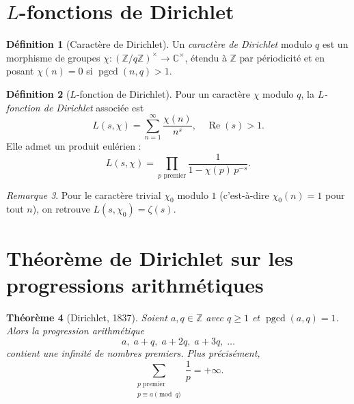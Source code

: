 \documentclass[12pt,a4paper,openany]{book}
\theoremstyle{definition}
\newtheorem{definition}{Définition}[chapter]
\theoremstyle{plain}
\newtheorem{theoreme}[definition]{Théorème}
\theoremstyle{remark}
\newtheorem{remarque}[definition]{Remarque}
\newcommand{\Z}{\mathbb{Z}}
\newcommand{\C}{\mathbb{C}}
\DeclareMathOperator{\pgcd}{pgcd}
\begin{document}

\section{\texorpdfstring{$L$}{L}-fonctions de Dirichlet}
\label{sec:L-fonctions}

\begin{definition}[Caractère de Dirichlet]
\label{def:caractere-dirichlet}
Un \emph{caractère de Dirichlet} modulo $q$ est un morphisme de groupes
$\chi : (\Z/q\Z)^{\times} \to \C^{\times}$, étendu à $\Z$ par périodicité et
en posant $\chi(n) = 0$ si $\pgcd(n,q) > 1$.
\end{definition}

\begin{definition}[$L$-fonction de Dirichlet]
\label{def:L-fonction}
Pour un caractère $\chi$ modulo $q$, la \emph{$L$-fonction de Dirichlet} associée est
\[
  L(s, \chi) = \sum_{n=1}^{\infty} \frac{\chi(n)}{n^s}, \quad \operatorname{Re}(s) > 1.
\]
Elle admet un produit eulérien :
\[
  L(s, \chi) = \prod_{p \text{ premier}} \frac{1}{1 - \chi(p)\, p^{-s}}.
\]
\end{definition}

\begin{remarque}
\label{rem:L-fonction-zeta}
Pour le caractère trivial $\chi_0$ modulo $1$ (c'est-à-dire $\chi_0(n) = 1$
pour tout $n$), on retrouve $L(s, \chi_0) = \zeta(s)$.
\end{remarque}


\section{Théorème de Dirichlet sur les progressions arithmétiques}
\label{sec:dirichlet-progressions}

\begin{theoreme}[Dirichlet, 1837]
\label{thm:dirichlet-progressions}
Soient $a, q \in \Z$ avec $q \geq 1$ et $\pgcd(a, q) = 1$. Alors la progression
arithmétique
\[
  a, \; a + q, \; a + 2q, \; a + 3q, \; \ldots
\]
contient une infinité de nombres premiers. Plus précisément,
\[
  \sum_{\substack{p \text{ premier} \\ p \equiv a \!\!\pmod{q}}} \frac{1}{p} = +\infty.
\]
\end{theoreme}
\end{document}
